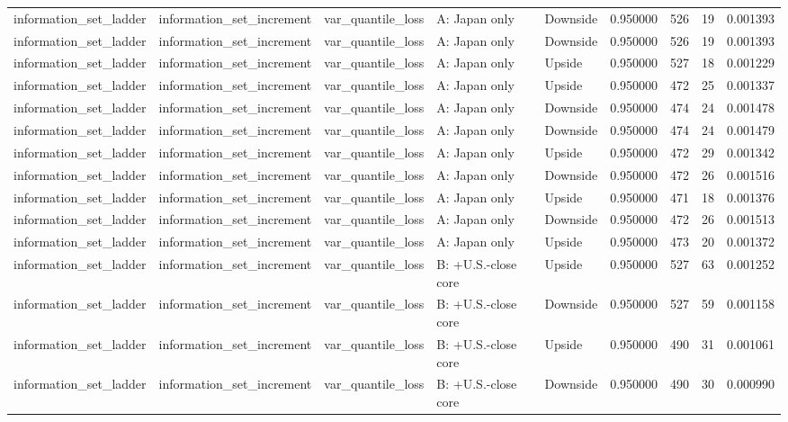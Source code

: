 \begin{tabular}{lllllrrr}
information\_set\_ladder & information\_set\_increment & var\_quantile\_loss & A: Japan only & Downside & 0.950000 & 526 & 19 & 0.001393 \\
information\_set\_ladder & information\_set\_increment & var\_quantile\_loss & A: Japan only & Downside & 0.950000 & 526 & 19 & 0.001393 \\
information\_set\_ladder & information\_set\_increment & var\_quantile\_loss & A: Japan only & Upside & 0.950000 & 527 & 18 & 0.001229 \\
information\_set\_ladder & information\_set\_increment & var\_quantile\_loss & A: Japan only & Upside & 0.950000 & 472 & 25 & 0.001337 \\
information\_set\_ladder & information\_set\_increment & var\_quantile\_loss & A: Japan only & Downside & 0.950000 & 474 & 24 & 0.001478 \\
information\_set\_ladder & information\_set\_increment & var\_quantile\_loss & A: Japan only & Downside & 0.950000 & 474 & 24 & 0.001479 \\
information\_set\_ladder & information\_set\_increment & var\_quantile\_loss & A: Japan only & Upside & 0.950000 & 472 & 29 & 0.001342 \\
information\_set\_ladder & information\_set\_increment & var\_quantile\_loss & A: Japan only & Downside & 0.950000 & 472 & 26 & 0.001516 \\
information\_set\_ladder & information\_set\_increment & var\_quantile\_loss & A: Japan only & Upside & 0.950000 & 471 & 18 & 0.001376 \\
information\_set\_ladder & information\_set\_increment & var\_quantile\_loss & A: Japan only & Downside & 0.950000 & 472 & 26 & 0.001513 \\
information\_set\_ladder & information\_set\_increment & var\_quantile\_loss & A: Japan only & Upside & 0.950000 & 473 & 20 & 0.001372 \\
information\_set\_ladder & information\_set\_increment & var\_quantile\_loss & B: +U.S.-close core & Upside & 0.950000 & 527 & 63 & 0.001252 \\
information\_set\_ladder & information\_set\_increment & var\_quantile\_loss & B: +U.S.-close core & Downside & 0.950000 & 527 & 59 & 0.001158 \\
information\_set\_ladder & information\_set\_increment & var\_quantile\_loss & B: +U.S.-close core & Upside & 0.950000 & 490 & 31 & 0.001061 \\
information\_set\_ladder & information\_set\_increment & var\_quantile\_loss & B: +U.S.-close core & Downside & 0.950000 & 490 & 30 & 0.000990 \\

\end{tabular}
